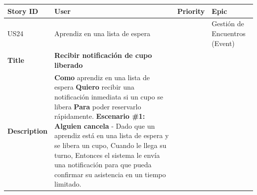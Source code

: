 {\def\LTcaptype{none} %
\begin{longtable}[]{@{}
  >{\raggedright\arraybackslash}p{}
  >{\raggedright\arraybackslash}p{}
  >{\raggedright\arraybackslash}p{}
  >{\raggedright\arraybackslash}p{}@{}}
\toprule\noalign{}
\begin{minipage}[b]{\linewidth}\raggedright
Story ID
\end{minipage} & \begin{minipage}[b]{\linewidth}\raggedright
User
\end{minipage} & \begin{minipage}[b]{\linewidth}\raggedright
Priority
\end{minipage} & \begin{minipage}[b]{\linewidth}\raggedright
Epic
\end{minipage} \\
\midrule\noalign{}
\endhead
\bottomrule\noalign{}
\endlastfoot
US24 & Aprendiz en una lista de espera & 5 & Gestión de Encuentros
(Event) \\
\textbf{Title} & \textbf{Recibir notificación de cupo liberado} & & \\
\textbf{Description} & \textbf{Como} aprendiz en una lista de espera
\textbf{Quiero} recibir una notificación inmediata si un cupo se libera
\textbf{Para} poder reservarlo rápidamente. \textbf{Escenario \#1:
Alguien cancela} - Dado que un aprendiz está en una lista de espera y se
libera un cupo, Cuando le llega su turno, Entonces el sistema le envía
una notificación para que pueda confirmar su asistencia en un tiempo
limitado. & & \\
\end{longtable}
}

